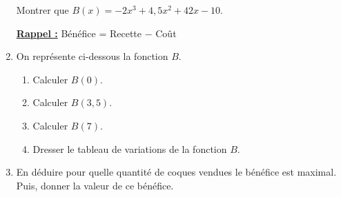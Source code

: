 \documentclass[a4paper]{article}
\begin{document}
\begin{exerciceinterro}{}{}
\begin{enumerate}
        Montrer que $B(x) = -2x^3 + 4,5x^2 + 42x - 10$.

        \underline{\bf Rappel :} Bénéfice = Recette $-$ Coût


        \item On représente ci-dessous la fonction $B$.
      \vspace{2mm}
      
     
      \begin{center}
    \end{center}

      \begin{enumerate}
        \item Calculer $B(0)$.
        \item Calculer $B(3,5)$.
        \item Calculer $B(7)$.
        \item Dresser le tableau de variations de la fonction $B$.
      \end{enumerate}
      \item En déduire pour quelle quantité de coques vendues le bénéfice est maximal. Puis, donner la valeur de ce bénéfice.

      \end{enumerate}
            

    \end{exerciceinterro}
  \pagebreak
  
  
  
  


  
\end{document}
